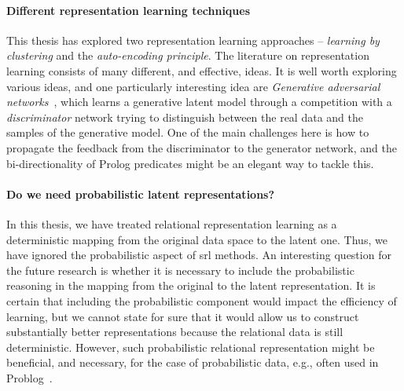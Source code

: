 \paragraph{Different representation learning techniques}
This thesis has explored two representation learning approaches -- \textit{learning by clustering} and the \textit{auto-encoding principle}.
The literature on representation learning consists of many different, and effective, ideas.
It is well worth exploring various ideas, and one particularly interesting idea are \textit{Generative adversarial networks}~\cite{Goodfellow:2014:GAN:2969033.2969125}, which learns a generative latent model through a competition with a \textit{discriminator} network trying to distinguish between the real data and the samples of the generative model.
One of the main challenges here is how to propagate the feedback from the discriminator to the generator network, and the bi-directionality of Prolog predicates might be an elegant way to tackle this.


\paragraph{Do we need probabilistic latent representations?}
In this thesis, we have treated relational representation learning as a deterministic mapping from the original data space to the latent one.
Thus,  we have ignored the probabilistic aspect of \gls{srl} methods.
An interesting question for the future research is whether it is necessary to include the probabilistic reasoning in the mapping from the original to the latent representation.
It is certain that including the probabilistic component would impact the efficiency of learning, but we cannot state for sure that it would allow us to construct substantially better representations because the relational data is still deterministic.
However, such probabilistic relational representation might be beneficial, and necessary, for the case of probabilistic data, e.g., often used in Problog~\cite{DeRaedt:2007:PPP:1625275.1625673}.




